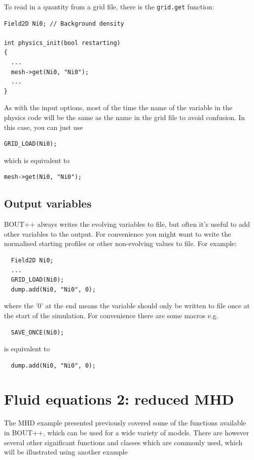 \documentclass[12pt]{article}
\newcommand{\code}[1]{\texttt{#1}}
\begin{document}
To read in a quantity from a grid file, there is the \code{grid.get} function:

\begin{lstlisting}
Field2D Ni0; // Background density

int physics_init(bool restarting)
{
  ...
  mesh->get(Ni0, "Ni0");
  ...
}
\end{lstlisting}

As with the input options, most of the time the name of the variable in the
physics code will be the same as the name in the grid file to avoid confusion.
In this case, you can just use 
\begin{lstlisting}
GRID_LOAD(Ni0);
\end{lstlisting}
which is equivalent to
\begin{lstlisting}
mesh->get(Ni0, "Ni0");
\end{lstlisting}

\subsection{Output variables}
BOUT++ always writes the evolving variables to file, but often it's useful to add other variables
to the output. For convenience you might want to write the normalised starting profiles or other
non-evolving values to file. For example:
\begin{lstlisting}
  Field2D Ni0;
  ...
  GRID_LOAD(Ni0);
  dump.add(Ni0, "Ni0", 0); 
\end{lstlisting}
where the '0' at the end means the variable should only be written to file once at the start of the
simulation. For convenience there are some macros e.g. 
\begin{lstlisting}
  SAVE_ONCE(Ni0); 
\end{lstlisting}
is equivalent to
\begin{lstlisting}
  dump.add(Ni0, "Ni0", 0); 
\end{lstlisting}


\section{Fluid equations 2: reduced MHD}

The MHD example presented previously covered some of the functions available in BOUT++,
which can be used for a wide variety of models. There are however several other significant
functions and classes which are commonly used, which will be illustrated using another example
\end{document}
